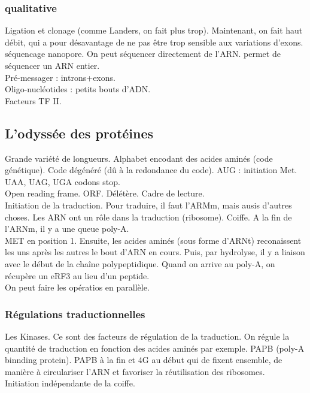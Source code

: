 \documentclass[10pt,a4paper]{article}
\begin{document}
\subsubsection{qualitative}
Ligation et clonage (comme Landers, on fait plus trop). Maintenant, on fait haut débit, qui a pour désavantage de ne pas être trop sensible aux variations d'exons.\\
séquencage nanopore. On peut séquencer directement de l'ARN. permet de séquencer un ARN entier.\\
Pré-messager : introns+exons.\\
Oligo-nucléotides : petits bouts d'ADN.\\


Facteurs TF II.

\subsection{L'odyssée des protéines}


Grande variété de longueurs. Alphabet encodant des acides aminés (code génétique). Code dégénéré (dû à la redondance du code). AUG : initiation Met. UAA, UAG, UGA codons stop.\\
Open reading frame. ORF. Délétère. Cadre de lecture.\\
Initiation de la traduction. Pour traduire, il faut l'ARMm, mais ausis d'autres choses. Les ARN ont un rôle dans la traduction (ribosome). Coiffe. A la fin de l'ARNm, il y a une queue poly-A.\\
MET en position 1. Ensuite, les acides aminés (sous forme d'ARNt) reconaissent les uns après les autres le bout d'ARN en cours. Puis, par hydrolyse, il y a liaison avec le début de la chaîne polypeptidique. Quand on arrive au poly-A, on récupère un eRF3 au lieu d'un peptide.\\
On peut faire les opératios en parallèle.\\

\subsubsection{Régulations traductionnelles}

Les Kinases. Ce sont des facteurs de régulation de la traduction. On régule la quantité de traduction en fonction des acides aminés par exemple. PAPB (poly-A binnding protein). PAPB à la fin et 4G au début qui de fixent ensemble, de manière à circulariser l'ARN et favoriser la réutilisation des ribosomes.\\
Initiation indépendante de la coiffe. \\
\end{document}
